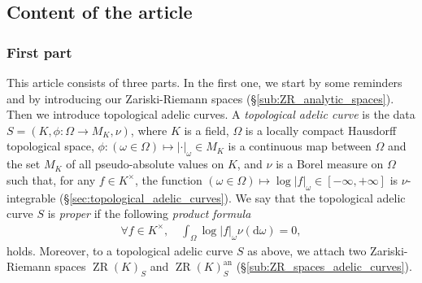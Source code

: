 \documentclass [11pt,reqno]{amsart}
\newcommand{\1}{\mathmybb{1}}
\def\an{\operatorname{an}}
\def\diff{\mathrm{d}}
\def\ZR{\operatorname{ZR}}
\begin{document}
\subsection*{Content of the article}

\subsubsection*{First part}
This article consists of three parts. In the first one, we start by some reminders and by introducing our Zariski-Riemann spaces (\S \ref{sub:ZR_analytic_spaces}). Then we introduce topological adelic curves. A \emph{topological adelic curve} is the data $S=(K,\phi : \Omega \to M_{K}, \nu)$, where $K$ is a field, $\Omega$ is a locally compact Hausdorff topological space, $\phi:(\omega\in\Omega)\mapsto |\cdot|_{\omega}\in M_K$ is a continuous map between $\Omega$ and the set $M_K$ of all pseudo-absolute values on $K$, and $\nu$ is a Borel measure on $\Omega$ such that, for any $f\in K^{\times}$, the function $(\omega\in\Omega)\mapsto \log|f|_{\omega} \in [-\infty,+\infty]$ is $\nu$-integrable (\S \ref{sec:topological_adelic_curves}). We say that the topological adelic curve $S$ is \emph{proper} if the following \emph{product formula}
\begin{align*}
\forall f\in K^{\times}, \quad \int_{\Omega}\log|f|_{\omega}\nu(\diff\omega) = 0,
\end{align*} 
holds. Moreover, to a topological adelic curve $S$ as above, we attach two Zariski-Riemann spaces $\ZR(K)_{S}$ and $\ZR(K)_{S}^{\an}$ (\S \ref{sub:ZR_spaces_adelic_curves}). 
\end{document}
